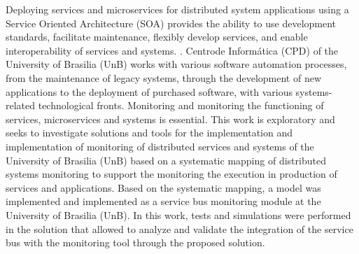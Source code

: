 Deploying services and microservices for distributed system applications using a Service Oriented Architecture (SOA) provides the ability to use development standards, facilitate maintenance, flexibly develop services, and enable interoperability of services and systems. . Centrode Informática (CPD) of the University of Brasilia (UnB) works with various software automation processes, from the maintenance of legacy systems, through the development of new applications to the deployment of purchased software, with various systems-related technological fronts. Monitoring and monitoring the functioning of services, microservices and systems is essential. This work is exploratory and seeks to investigate solutions and tools for the implementation and implementation of monitoring of distributed services and systems of the University of Brasilia (UnB) based on a systematic mapping of distributed systems monitoring to support the monitoring the execution in production of services and applications. Based on the systematic mapping, a model was implemented and implemented as a service bus monitoring module at the University of Brasilia (UnB). In this work, tests and simulations were performed in the solution that allowed to analyze and validate the integration of the service bus with the monitoring tool through the proposed solution.